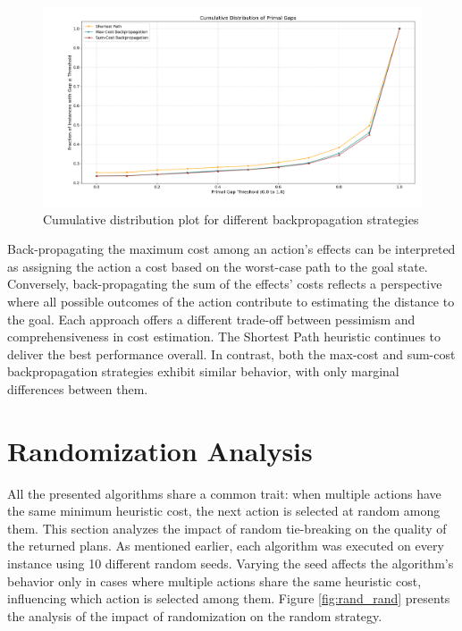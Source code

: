 \begin{figure}[h!]
	\centering
	\includegraphics[width=\textwidth]{images/algs456.png}
	\caption{Cumulative distribution plot for different backpropagation strategies}
	\label{fig:backprop}
\end{figure}

Back-propagating the maximum cost among an action’s effects can be interpreted as assigning the action a cost based on
the worst-case path to the goal state. Conversely, back-propagating the sum of the effects' costs reflects a perspective
where all possible outcomes of the action contribute to estimating the distance to the goal. Each approach offers a different
trade-off between pessimism and comprehensiveness in cost estimation.
The Shortest Path heuristic continues to deliver the best performance overall. In contrast, both the max-cost and sum-cost
backpropagation strategies exhibit similar behavior, with only marginal differences between them.

\section{Randomization Analysis}
All the presented algorithms share a common trait: when multiple actions have the same minimum heuristic cost,
the next action is selected at random among them.
This section analyzes the impact of random tie-breaking on the quality of the returned plans. As mentioned earlier,
each algorithm was executed on every instance using 10 different random seeds. Varying the seed affects the algorithm’s
behavior only in cases where multiple actions share the same heuristic cost, influencing which action is selected among them.
Figure \ref{fig:rand_rand} presents the analysis of the impact of randomization on the random strategy.


